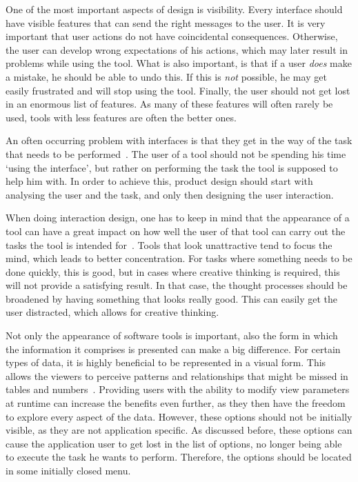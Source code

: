 One of the most important aspects of design is visibility. Every interface should have visible features that can send the right messages to the user. It is very important that user actions do not have coincidental consequences. Otherwise, the user can develop wrong expectations of his actions, which may later result in problems while using the tool. What is also important, is that if a user \emph{does} make a mistake, he should be able to undo this. If this is \emph{not} possible, he may get easily frustrated and will stop using the tool. Finally, the user should not get lost in an enormous list of features. As many of these features will often rarely be used, tools with less features are often the better ones.

An often occurring problem with interfaces is that they get in the way of the task that needs to be performed~\cite{norman1990interfaces}. The user of a tool should not be spending his time `using the interface', but rather on performing the task the tool is supposed to help him with. In order to achieve this, product design should start with analysing the user and the task, and only then designing the user interaction.

When doing interaction design, one has to keep in mind that the appearance of a tool can have a great impact on how well the user of that tool can carry out the tasks the tool is intended for~\cite{norman2002emotion}. Tools that look unattractive tend to focus the mind, which leads to better concentration. For tasks where something needs to be done quickly, this is good, but in cases where creative thinking is required, this will not provide a satisfying result. In that case, the thought processes should be broadened by having something that looks really good. This can easily get the user distracted, which allows for creative thinking.

Not only the appearance of software tools is important, also the form in which the information it comprises is presented can make a big difference. For certain types of data, it is highly beneficial to be represented in a visual form. This allows the viewers to perceive patterns and relationships that might be missed in tables and numbers~\cite{gallopoulos1994computer}. Providing users with the ability to modify view parameters at runtime can increase the benefits even further, as they then have the freedom to explore every aspect of the data. However, these options should not be initially visible, as they are not application specific. As discussed before, these options can cause the application user to get lost in the list of options, no longer being able to execute the task he wants to perform. Therefore, the options should be located in some initially closed menu.

